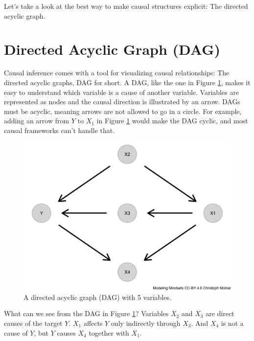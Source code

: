 \documentclass[
  10pt,
]{scrbook}
\begin{document}
Let's take a look at the best way to make causal structures explicit: The directed acyclic graph.

\hypertarget{directed-acyclic-graph-dag}{%
\section{Directed Acyclic Graph (DAG)}\label{directed-acyclic-graph-dag}}

Causal inference comes with a tool for visualizing causal relationships: The directed acyclic graphs, DAG for short.
A DAG, like the one in Figure \ref{fig:dag}, makes it easy to understand which variable is a cause of another variable.
Variables are represented as nodes and the causal direction is illustrated by an arrow.
DAGs must be acyclic, meaning arrows are not allowed to go in a circle.
For example, adding an arrow from \(Y\) to \(X_1\) in Figure \ref{fig:dag} would make the DAG cyclic, and most causal frameworks can't handle that.

\begin{figure}

{\centering \includegraphics[width=\textwidth]{figures/dag-1} 

}

\caption{A directed acyclic graph (DAG) with 5 variables.}\label{fig:dag}
\end{figure}

What can we see from the DAG in Figure \ref{fig:dag}?
Variables \(X_2\) and \(X_3\) are direct causes of the target \(Y\).
\(X_1\) affects \(Y\) only indirectly through \(X_3\).
And \(X_4\) is not a cause of \(Y\), but \(Y\) causes \(X_4\) together with \(X_1\).
\end{document}
